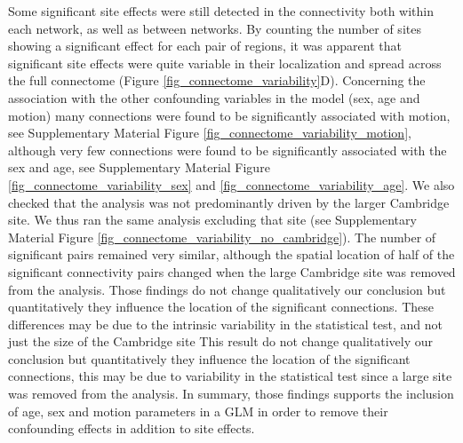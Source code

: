 \documentclass[authoryear]{elsarticle}
\begin{document}
Some significant site effects were still detected in the connectivity both within each network, as well as between networks. By counting the number of sites showing a significant effect for each pair of regions, it was apparent that significant site effects were quite variable in their localization and spread across the full connectome (Figure \ref{fig_connectome_variability}D). 
Concerning the association with the other confounding variables in the model (sex, age and motion) many connections were found to be significantly associated with motion, see Supplementary Material Figure \ref{fig_connectome_variability_motion}, although very few connections were found to be significantly associated with the sex and age, see Supplementary Material Figure \ref{fig_connectome_variability_sex} and \ref{fig_connectome_variability_age}. We also checked that the analysis was not predominantly driven by the larger Cambridge site. We thus ran the same analysis excluding that site (see Supplementary Material Figure \ref{fig_connectome_variability_no_cambridge}). The number of significant pairs remained very similar, although the spatial location of half of the significant connectivity pairs changed when the large Cambridge site was removed from the analysis. Those findings do not change qualitatively our conclusion but quantitatively they influence the location of the significant connections. These differences may be due to the intrinsic variability in the statistical test, and not just the size of the Cambridge site This result do not change qualitatively our conclusion but quantitatively they influence the location of the significant connections, this may be due to variability in the statistical test since a large site was removed  from the analysis. In summary, those findings supports the inclusion of age, sex and motion parameters in a GLM in order to remove their confounding effects in addition to site effects.
\end{document}
